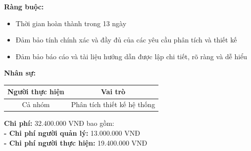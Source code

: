{\begin{minipage}{\textwidth}
\begin{itemize}
        \end{itemize}
        \noindent \textbf{Ràng buộc:}
        \begin{itemize}
            \item Thời gian hoàn thành trong 13 ngày
            \item Đảm bảo tính chính xác và đầy đủ của các yêu cầu phân tích và thiết kế
            \item Đảm bảo báo cáo và tài liệu hướng dẫn được lập chi tiết, rõ ràng và dễ hiểu
        \end{itemize}
        \noindent \textbf{Nhân sự:}
        \begin{longtable}{|c|c|}
        \hline
        \textbf{Người thực hiện} & \textbf{Vai trò} \\
        \hline
        Cả nhóm & Phân tích thiết kế hệ thống \\
        \hline
        \end{longtable}
        \noindent \textbf{Chi phí:} 32.400.000 VNĐ bao gồm:\\
        \noindent \textbf{  - Chi phí người quản lý:} 13.000.000 VNĐ\\
        \noindent \textbf{  - Chi phí người thực hiện:} 19.400.000 VNĐ
	\end{minipage}
}
\newpage
{}        
